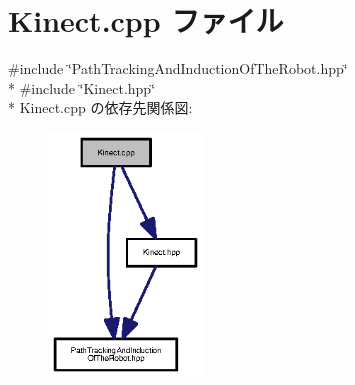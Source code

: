 \section{Kinect.\-cpp ファイル}
\label{_kinect_8cpp}
{\ttfamily \#include \char`\"{}Path\-Tracking\-And\-Induction\-Of\-The\-Robot.\-hpp\char`\"{}}\\*
{\ttfamily \#include \char`\"{}Kinect.\-hpp\char`\"{}}\\*
Kinect.\-cpp の依存先関係図\-:\nopagebreak
\begin{figure}[H]
\begin{center}
\leavevmode
\includegraphics[width=116pt]{_kinect_8cpp__incl}
\end{center}
\end{figure}
